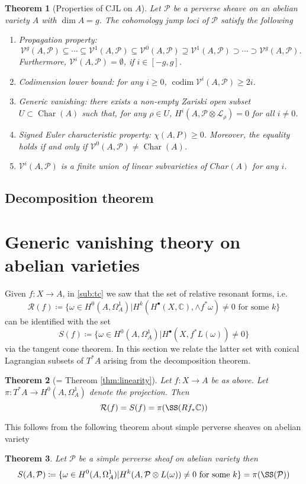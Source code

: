 \documentclass[11pt,reqno]{amsart}
\newtheorem{theorem}{Theorem}[section]
\theoremstyle{definition}
\theoremstyle{remark}
\theoremstyle{cited}
\theoremstyle{citeddef}
\DeclareMathOperator{\codim}{codim}              %
\DeclareMathOperator{\Char}{Char}
\newcommand{\sL}{\mathcal{L}}
\newcommand{\sP}{\mathcal{P}}
\newcommand{\sR}{\mathcal{R}}
\newcommand\sV{{\mathcal V}}
\newcommand{\bbC}{\mathbb{C}}
\begin{document}
\begin{theorem}[Properties of CJL on $A$]
Let $\sP$ be a perverse sheave on an abelian variety $A$ with $\dim A = g$.
The
cohomology jump loci of $\sP$ satisfy the following
\begin{enumerate}
	\item Propagation property:
\[\sV^g(A, \sP) \subseteq \cdots\subseteq \sV^1(A, \sP) 
\subseteq \sV^0(A, \sP) \supseteq \sV^1(A, \sP) \supset\cdots\supset \sV^g(A, \sP).\]
Furthermore, $\sV^i(A, \sP) = \emptyset$, if $i \in [-g, g]$.
\item Codimension lower bound: for any $i \geq 0$,
$\codim \sV^i(A, \sP) \geq 2i$.
\item Generic vanishing: there exists a non-empty Zariski open subset $U \subset \Char(A)$
such that, for any $\rho\in U$, $H^i(A, \sP 
\otimes \sL_{\rho}) = 0$ for all $i \neq 0$.
\item Signed Euler characteristic property:
$\chi(A, P) \geq 0$.
Moreover, the equality holds if and only if $\sV^0(A, \sP) \neq \Char(A)$.
\item $\sV^i(A, \sP)$ is a finite union of linear subvarieties of $Char(A)$ for any $i$.
\end{enumerate}
\label{thm:gvperverse}
\end{theorem} 

\subsection{Decomposition theorem}



\section{Generic vanishing theory on abelian varieties}
Given $f\colon X\to A$, in \ref{sub:tc} we saw that the set of relative resonant forms, i.e.
\[\sR(f)\coloneqq \{\omega\in H^0(A,\Omega_A^1)| H^k(H^{\bullet}(X,\bbC),\wedge f^*\omega) \neq 0 \text{ for some }k\}\]
can be identified with the set 
\[S(f)\coloneqq \{\omega\in H^0(A,\Omega_A^1)| H^{\bullet}(X, f^*L(\omega))\neq 0\}\]
via the tangent cone theorem.
In this section we relate the latter set with conical Lagrangian subsets of $T^*A$ arising from the decomposition theorem.
\begin{theorem}[= Thereom \ref{thm:linearity}]
Let $f\colon X\to A$ be as above. Let $\pi\colon T^*A\to H^0(A,\Omega_A^1)$ denote the projection. Then
\[\sR(f) = S(f) = \pi(\SS(Rf_*\bbC))\]
\end{theorem}
This follows from the following theorem about simple perverse sheaves on abelian variety
\begin{theorem}
Let $\sP$ be a simple perverse sheaf on abelian variety then
\[S(A,\sP)\coloneqq \{\omega\in H^0(A,\Omega_A^1)| H^k(A, \sP\otimes L(\omega)) \neq 0 \text{ for some } k\} = \pi(\SS(\sP))\]
\label{thm:perverse}
\end{theorem}
\end{document}
